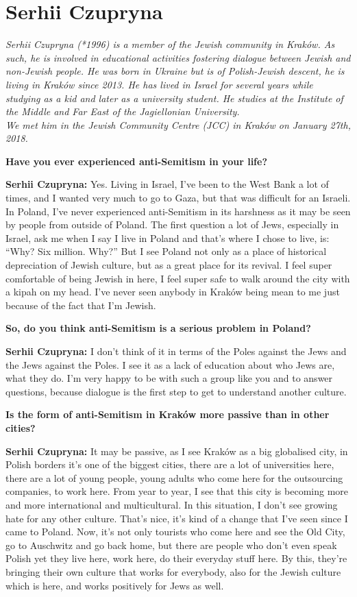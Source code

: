 \section{Serhii Czupryna}

\textit{Serhii Czupryna (*1996) is a member of the Jewish community in Kraków. As such, he is involved in educational activities fostering dialogue between Jewish and non-Jewish people. He was born in Ukraine but is of Polish-Jewish descent, he is living in Kraków since 2013. He has lived in Israel for several years while studying as a kid and later as a university student. He studies at the Institute of the Middle and Far East of the Jagiellonian University. \\
We met him in the Jewish Community Centre (JCC) in Kraków on January 27th, 2018.}\par
\vspace*{2em}
\textbf{Have you ever experienced anti-Semitism in your life?}\par
\textbf{Serhii Czupryna:} Yes. Living in Israel, I’ve been to the West Bank a lot of times, and I wanted very much to go to Gaza, but that was difficult for an Israeli. In Poland, I’ve never experienced anti-Semitism in its harshness as it may be seen by people from outside of Poland. The first question a lot of Jews, especially in Israel, ask me when I say I live in Poland and that’s where I chose to live, is: ``Why? Six million. Why?'' But I see Poland not only as a place of historical depreciation of Jewish culture, but as a great place for its revival. I feel super comfortable of being Jewish in here, I feel super safe to walk around the city with a kipah on my head. I’ve never seen anybody in Kraków being mean to me just because of the fact that I’m Jewish. \par
\textbf{So, do you think anti-Semitism is a serious problem in Poland?}\par 
\textbf{Serhii Czupryna:} I don’t think of it in terms of the Poles against the Jews and the Jews against the Poles. I see it as a lack of education about who Jews are, what they do. I’m very happy to be with such a group like you and to answer questions, because dialogue is the first step to get to understand another culture. \par
\textbf{Is the form of anti-Semitism in Kraków more passive than in other cities?}\par
\textbf{Serhii Czupryna:} It may be passive, as I see Kraków as a big globalised city, in Polish borders it’s one of the biggest cities, there are a lot of universities here, there are a lot of young people, young adults who come here for the outsourcing companies, to work here. From year to year, I see that this city is becoming more and more international and multicultural. In this situation, I don’t see growing hate for any other culture. That’s nice, it's kind of a change that I’ve seen since I came to Poland. Now, it’s not only tourists who come here and see the Old City, go to Auschwitz and go back home, but there are people who don’t even speak Polish yet they live here, work here, do their everyday stuff here. By this, they’re bringing their own culture that works for everybody, also for the Jewish culture which is here, and works positively for Jews as well.\par 
